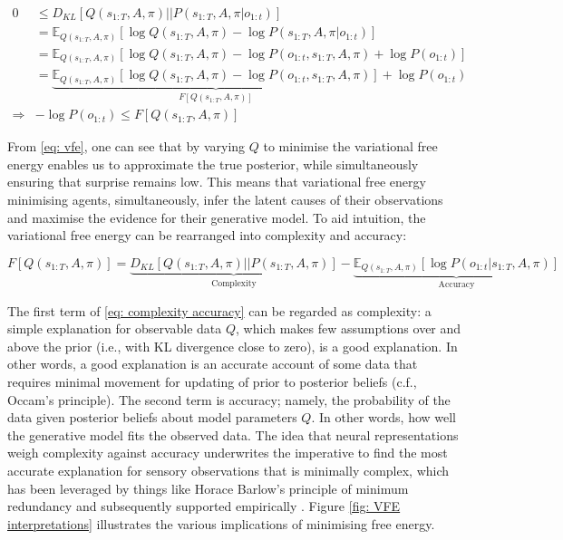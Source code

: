 \documentclass{article}
\newcommand{\E}{\mathbb E}
\begin{document}
  	\begin{equation}
  	\label{eq: vfe}
  	    \begin{split}
  	        0 &\leq D_{KL}[Q(s_{1:T}, A, \pi)||P(s_{1:T}, A, \pi |o_{1:t})] \\
  	        &= \E_{Q(s_{1:T}, A, \pi)}[\log Q(s_{1:T}, A, \pi) - \log P(s_{1:T}, A, \pi |o_{1:t})] \\
  	        &= \E_{Q(s_{1:T}, A, \pi)}[\log Q(s_{1:T}, A, \pi) - \log P(o_{1:t},s_{1:T}, A, \pi) + \log P(o_{1:t})] \\
  	        &= \underbrace{\E_{Q(s_{1:T}, A, \pi)}[\log Q(s_{1:T}, A, \pi) - \log P(o_{1:t},s_{1:T}, A, \pi)]}_{F[Q(s_{1:T}, A, \pi)]} + \log P(o_{1:t}) \\
  	        \Rightarrow & -\log P(o_{1:t}) \leq F[Q(s_{1:T}, A, \pi)]
  	    \end{split}
  	\end{equation}
  	
From \eqref{eq: vfe}, one can see that by varying $Q$ to minimise the variational free energy enables us to approximate the true posterior, while simultaneously ensuring that surprise remains low. This means that variational free energy minimising agents, simultaneously, infer the latent causes of their observations and maximise the evidence for their generative model.
To aid intuition, the variational free energy can be rearranged into complexity and accuracy:

  	\begin{equation}
  	\label{eq: complexity accuracy}
  	    F[Q(s_{1:T}, A, \pi)] = \underbrace{D_{KL}[Q(s_{1:T}, A, \pi)||P(s_{1:T}, A, \pi)]}_{\text{Complexity}}-\underbrace{\E_{Q(s_{1:T}, A, \pi)}[\log P(o_{1:t}|s_{1:T}, A, \pi)]}_{\text{Accuracy}}
  	\end{equation}
  	
The first term of \eqref{eq: complexity accuracy} can be regarded as complexity: a simple explanation for observable data $Q$, which makes few assumptions over and above the prior (i.e., with KL divergence close to zero), is a good explanation. In other words, a good explanation is an accurate account of some data that requires minimal movement for updating of prior to posterior beliefs (c.f., Occam's principle). The second term is accuracy; namely, the probability of the data given posterior beliefs about model parameters $Q$. In other words, how well the generative model fits the observed data. The idea that neural representations weigh complexity against accuracy underwrites the imperative to find the most accurate explanation for sensory observations that is minimally complex, which has been leveraged by things like Horace Barlow’s principle of minimum redundancy \cite{barlowRedundancyReductionRevisited2001} and subsequently supported empirically \cite{danEfficientCodingNatural1996,lewickiEfficientCodingNatural2002,olshausenSparseCodingSensory2004,olshausenNewWindowSound2002}. Figure \ref{fig: VFE interpretations} illustrates the various implications of minimising free energy.
\end{document}
